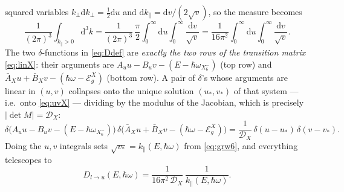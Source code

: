\documentclass[11pt,a4paper]{article}
\numberwithin{equation}{section}
\newcommand{\hw}{\hbar\omega}
\newcommand{\EgX}{\mathcal{E}_g^{X}}
\newcommand{\cD}{\mathcal{D}}
\newcommand{\AX}{\bar{A}_X}
\newcommand{\BX}{\bar{B}_X}
\newcommand{\kperp}{k_{\perp}}
\newcommand{\kpar}{k_{\parallel}}
\newcommand{\dd}{\mathrm{d}}
\newcommand{\wXsix}{\hbar\omega_{X_6^-}}
\begin{document}
squared variables $\kperp\dd\kperp=\tfrac12\dd u$ and
$\dd\kpar=\dd v/(2\sqrt v)$, so the measure becomes
\[
\frac{1}{(2\pi)^3}\int_{\kpar>0}\!\dd^3k
=\frac{1}{(2\pi)^3}\,\frac{\pi}{2}
 \int_0^\infty\!\!\dd u\int_0^\infty\!\frac{\dd v}{\sqrt v}
=\frac{1}{16\pi^2}
 \int_0^\infty\!\!\dd u\int_0^\infty\!\frac{\dd v}{\sqrt v}.
\]
The two $\delta$-functions in \eqref{eq:Ddef} are \emph{exactly the
two rows of the transition matrix} \eqref{eq:linX}: their arguments
are $A_u u-B_u v-(E-\wXsix)$ (top row) and $\AX u+\BX v-(\hw-\EgX)$
(bottom row). A pair of $\delta$'s whose arguments are linear in
$(u,v)$ collapses onto the unique solution $(u_*,v_*)$ of that system
--- i.e.\ onto \eqref{eq:uvX} --- dividing by the modulus of the
Jacobian, which is precisely $|\det M|=\cD_X$:
\[
\delta\!\bigl(A_u u-B_u v-(E-\wXsix)\bigr)\,
\delta\!\bigl(\AX u+\BX v-(\hw-\EgX)\bigr)
=\frac{1}{\cD_X}\,\delta(u-u_*)\,\delta(v-v_*).
\]
Doing the $u,v$ integrals sets $\sqrt{v_*}=\kpar(E,\hw)$ from
\eqref{eq:grw6}, and everything telescopes to
\begin{equation}
D_{l\to u}(E,\hw)=\frac{1}{16\pi^2\,\cD_X}\,\frac{1}{\kpar(E,\hw)}.
\label{eq:Dintermediate}
\end{equation}
\end{document}
